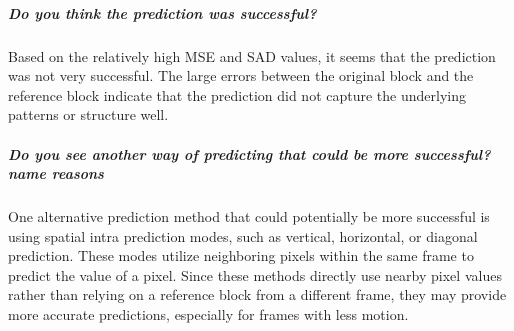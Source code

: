 \documentclass[letterpaper, 12pt]{article}
\begin{document}
\subparagraph{\textbf{Do you think the prediction was successful?}}
Based on the relatively high MSE and SAD values, it seems that the prediction was not very successful. The large errors between the original block and the reference block indicate that the prediction did not capture the underlying patterns or structure well.


\subparagraph{\textbf{Do you see another way of predicting that could be more successful? name reasons}}
One alternative prediction method that could potentially be more successful is using spatial intra prediction modes, such as vertical, horizontal, or diagonal prediction. These modes utilize neighboring pixels within the same frame to predict the value of a pixel. Since these methods directly use nearby pixel values rather than relying on a reference block from a different frame, they may provide more accurate predictions, especially for frames with less motion. 
\end{document}
